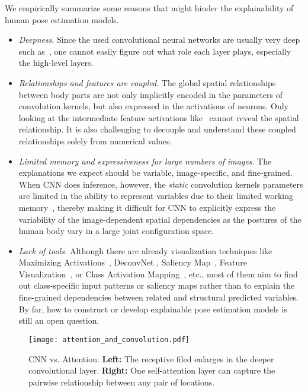 \documentclass{article}
\begin{document}
We empirically summarize some reasons that might hinder the explainability of human pose estimation models. 
\begin{itemize}
\item \emph{Deepness}. Since the used convolutional neural networks are usually very deep such as~\cite{wei2016convolutional,newell2016stacked,xiao2018simple,sun2019hrnet}, one cannot easily figure out what role each layer plays, especially the high-level layers. 
\item \emph{Relationships and features are coupled}. The global spatial relationships between body parts are not only implicitly encoded in the parameters of convolution kernels, but also expressed in the activations of neurons. Only looking at the intermediate feature activations like~\cite{li2015heterogeneous, zhang2018occluded} cannot reveal the spatial relationship. It is also challenging to decouple and understand these coupled relationships solely from numerical values. 
\item \emph{Limited memory and expressiveness for large numbers of images}. The explanations we expect should be variable, image-specific, and fine-grained. When CNN does inference, however, the \emph{static} convolution kernels parameters are limited in the ability to represent variables due to their limited working memory~\cite{graves2014neural,graves2016hybrid, hochreiter1997long}, thereby making it difficult for CNN to explicitly express the variability of the image-dependent spatial dependencies as the postures of the human body vary in a large joint configuration space.
\item \emph{Lack of tools.} Although there are already visualization techniques like Maximizing Activations~\cite{erhan2009visualizing}, DeconvNet \cite{zeiler2014visualizing}, Saliency Map~\cite{simonyan2013deep, fong2017interpretable}, Feature Visualization~\cite{olah2017feature}, or Class Activation Mapping~\cite{zhou2016learning}, etc., most of them aim to find out class-specific input patterns or saliency maps rather than to explain the fine-grained dependencies between related and structural predicted variables. By far, how to construct or develop explainable pose estimation models is still an open question. 
\end{itemize}


\begin{figure}[t]
	\begin{center}
\texttt{[image: attention\_and\_convolution.pdf]}
	\end{center}
	\caption{CNN vs. Attention. \textbf{Left:} The receptive filed enlarges in the deeper convolutional layer. \textbf{Right:} One self-attention layer can capture the pairwise relationship between any pair of locations.}
	\label{conv_vs_attention}\vspace*{-0.1in}
	
\end{figure}
\end{document}
